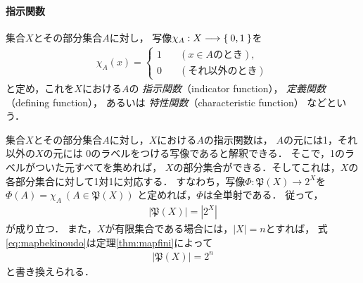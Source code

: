   \paragraph{指示関数}
   集合$X$とその部分集合$A$に対し，
   写像$\chi _A: X \longrightarrow \Set{0,1}$を
   \begin{align}
     \chi_A (x) = \left \{
       \begin{aligned}
         1 \quad & ( x \in A \text{のとき} ) , \\
         0 \quad & ( \text{それ以外のとき} ) 
       \end{aligned}
       \right.
   \end{align}
   と定め，これを$X$における$A$の
   \emph{指示関数}（indicator function），
   \emph{定義関数}（defining function），
   あるいは
   \emph{特性関数}（characteristic function）
   などという．

   集合$X$とその部分集合$A$に対し，$X$における$A$の指示関数は，
   $A$の元には1，それ以外の$X$の元には
   0のラベルをつける写像であると解釈できる．
   そこで，1のラベルがついた元すべてを集めれば，
   $X$の部分集合ができる．そしてこれは，$X$の各部分集合に対して1対1に対応する．
   すなわち，写像$\varPhi : \mathfrak{P}(X) \longrightarrow 2^X$を
   $\varPhi(A) = \chi _A \ (A \in \mathfrak{P}(X) )$
   と定めれば，$\varPhi$は全単射である．
   従って，
   \begin{align}
     \left \lvert \mathfrak{P}(X) \right \rvert = \left \lvert 2^X \right \rvert
     \label{eq:mapbekinoudo}
   \end{align}
   が成り立つ．
   また，$X$が有限集合である場合には，$\lvert X \rvert = n$とすれば，
   式\eqref{eq:mapbekinoudo}は定理\ref{thm:mapfini}によって
   \begin{align}
     \left \lvert \mathfrak{P}(X) \right \rvert = 2^{n}
     \label{eq:mapbekifini}
   \end{align}
   と書き換えられる．

